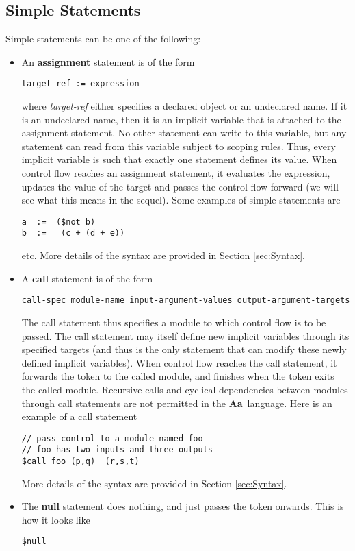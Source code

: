 \documentclass{article}
\newcommand{\Aa}{{\bf Aa}~}
\begin{document}
\subsection{Simple Statements}

Simple statements can be one of the following:
\begin{itemize}
\item An {\bf assignment} statement is of the form
\begin{verbatim}
target-ref := expression
\end{verbatim}
where {\em target-ref} either specifies a declared object
or an undeclared name.  If it is an undeclared name, then
it is an implicit variable that is attached to the
assignment statement.  No other statement can write to this
variable, but any statement can read from this variable
subject to scoping rules.  Thus, every implicit variable
is such that exactly one statement defines its value.
When control flow reaches an assignment statement, it
evaluates the expression, updates the value of the target
and passes the control flow forward (we will see what this
means in the sequel).
Some examples of simple statements are 
\begin{verbatim}
a  :=  ($not b)
b  :=   (c + (d + e))
\end{verbatim}
etc.  
More details of the syntax are provided in 
Section \ref{sec:Syntax}.
\item A {\bf call} statement is of the form
\begin{verbatim}
call-spec module-name input-argument-values output-argument-targets
\end{verbatim}
The call statement thus specifies a module to which control flow
is to be passed.  The call statement may itself define new implicit
variables through its specified targets (and thus is the only
statement that can modify these newly defined implicit variables).
When control flow reaches the call statement, it forwards the
token to the called module, and finishes when the token exits
the called module.  Recursive calls and cyclical dependencies between
modules through call statements are not permitted in the \Aa language.
Here is an example of a call statement
\begin{verbatim}
// pass control to a module named foo
// foo has two inputs and three outputs
$call foo (p,q)  (r,s,t)
\end{verbatim}
More details of the syntax are provided in 
Section \ref{sec:Syntax}.
\item The {\bf null} statement does nothing, and just passes the
token onwards.  This is how it looks like
\begin{verbatim}
$null
\end{verbatim}
\end{itemize}
\end{document}
